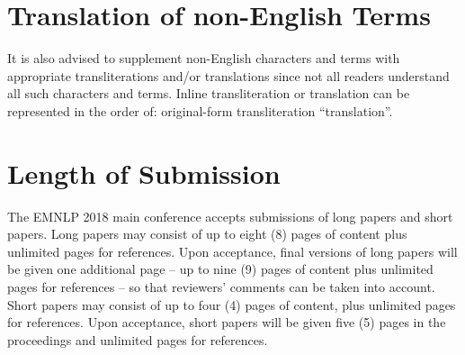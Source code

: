 \documentclass[11pt,a4paper]{article}
\newcommand\confname{EMNLP 2018}
\begin{document}



\section{Translation of non-English Terms}

It is also advised to supplement non-English characters and terms
with appropriate transliterations and/or translations
since not all readers understand all such characters and terms.
Inline transliteration or translation can be represented in
the order of: original-form transliteration ``translation''.

\section{Length of Submission}
\label{sec:length}

The \confname{} main conference accepts submissions of long papers and
short papers.
 Long papers may consist of up to eight (8) pages of
content plus unlimited pages for references. Upon acceptance, final
versions of long papers will be given one additional page -- up to nine (9)
pages of content plus unlimited pages for references -- so that reviewers' comments
can be taken into account. Short papers may consist of up to four (4)
pages of content, plus unlimited pages for references. Upon
acceptance, short papers will be given five (5) pages in the
proceedings and unlimited pages for references. 
\end{document}
